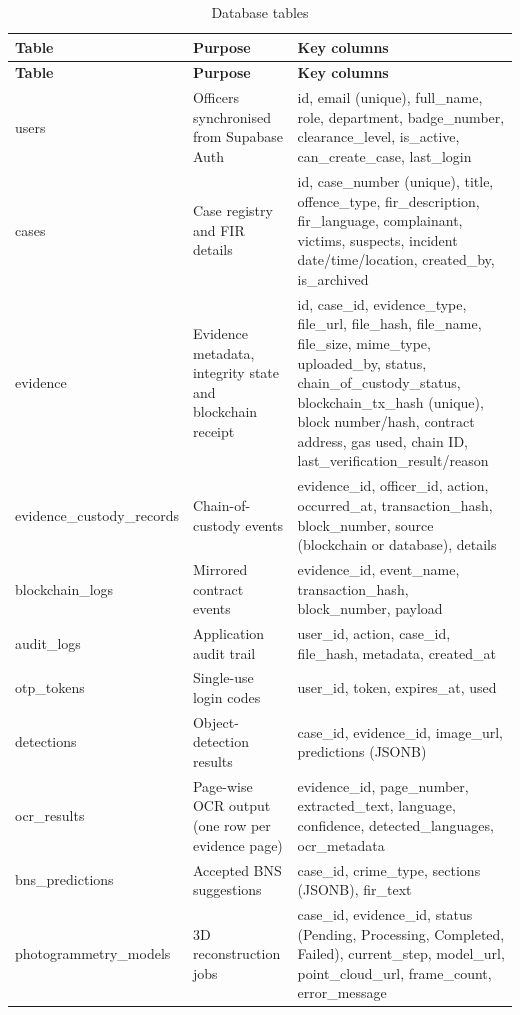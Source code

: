 \documentclass[12pt,a4paper,oneside]{report}
\begin{document}
{\footnotesize
\setlength{\tabcolsep}{3pt}
\renewcommand{\arraystretch}{1.15}
\begin{longtable}{|>{\raggedright\arraybackslash}p{3.22cm}|>{\raggedright\arraybackslash}p{3.98cm}|>{\raggedright\arraybackslash}p{7.01cm}|}
\caption{Database tables}\\
\hline
\rowcolor{headfill}\textbf{Table} & \textbf{Purpose} & \textbf{Key columns} \\ \hline
\endfirsthead
\hline
\rowcolor{headfill}\textbf{Table} & \textbf{Purpose} & \textbf{Key columns} \\ \hline
\endhead
\hline \endfoot
users & Officers synchronised from Supabase Auth & id, email (unique), full\_name, role, department, badge\_number, clearance\_level, is\_active, can\_create\_case, last\_login \\ \hline
cases & Case registry and FIR details & id, case\_number (unique), title, offence\_type, fir\_description, fir\_language, complainant, victims, suspects, incident date/time/location, created\_by, is\_archived \\ \hline
evidence & Evidence metadata, integrity state and blockchain receipt & id, case\_id, evidence\_type, file\_url, file\_hash, file\_name, file\_size, mime\_type, uploaded\_by, status, chain\_of\_custody\_status, blockchain\_tx\_hash (unique), block number/hash, contract address, gas used, chain ID, last\_verification\_result/reason \\ \hline
evidence\_custody\_records & Chain-of-custody events & evidence\_id, officer\_id, action, occurred\_at, transaction\_hash, block\_number, source (blockchain or database), details \\ \hline
blockchain\_logs & Mirrored contract events & evidence\_id, event\_name, transaction\_hash, block\_number, payload \\ \hline
audit\_logs & Application audit trail & user\_id, action, case\_id, file\_hash, metadata, created\_at \\ \hline
otp\_tokens & Single-use login codes & user\_id, token, expires\_at, used \\ \hline
detections & Object-detection results & case\_id, evidence\_id, image\_url, predictions (JSONB) \\ \hline
ocr\_results & Page-wise OCR output (one row per evidence page) & evidence\_id, page\_number, extracted\_text, language, confidence, detected\_languages, ocr\_metadata \\ \hline
bns\_predictions & Accepted BNS suggestions & case\_id, crime\_type, sections (JSONB), fir\_text \\ \hline
photogrammetry\_models & 3D reconstruction jobs & case\_id, evidence\_id, status (Pending, Processing, Completed, Failed), current\_step, model\_url, point\_cloud\_url, frame\_count, error\_message \\ \hline
\end{longtable}
}
\end{document}
